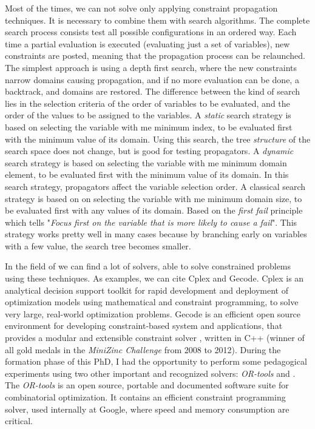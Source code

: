 Most of the times, we can not solve \csps{} only applying constraint propagation techniques. It is necessary to combine them with search algorithms. The complete search process consists test all possible configurations in an ordered way. Each time a partial evaluation is executed (evaluating just a set of variables), new constraints are posted, meaning that the propagation process can be relaunched. The simplest approach is using a depth first search, where the new constraints narrow domains causing propagation, and if no more evaluation can be done, a backtrack, and domains are restored. The difference between the kind of search lies in the selection criteria of the order of variables to be evaluated, and the order of the values to be assigned to the variables. A \textit{static} search strategy is based on selecting the variable with me minimum index, to be evaluated first with the minimum value of its domain. Using this search, the tree \textit{structure} of the search space does not change, but is good for testing propagators. A \textit{dynamic} search strategy is based on selecting the variable with me minimum domain element, to be evaluated first with the minimum value of its domain. In this search strategy, propagators affect the variable selection order. A classical search strategy is based on on selecting the variable with me minimum domain size, to be evaluated first with any values of its domain. Based on the \textit{first fail} principle which tells "\textit{Focus first on the variable that is more likely to cause a fail}". This strategy works pretty well in many cases because by branching early on variables with a few value, the search tree becomes smaller.

In the field of \cp{} we can find a lot of solvers, able to solve constrained problems using these techniques. As examples, we can cite {\sc Cplex} and {\sc Gecode}. {\sc Cplex} is an analytical decision support toolkit for rapid development and deployment of optimization models using mathematical and constraint programming, to solve very large, real-world optimization problems. {\sc Gecode} is an efficient open source environment for developing constraint-based system and applications, that provides a modular and extensible constraint solver \cite{Gecode}, written in C++ (winner of all gold medals in the \textit{MiniZinc Challenge} from 2008 to 2012). During the formation phase of this PhD, I had the opportunity to perform some pedagogical experiments using two other important and recognized solvers: \textit{OR-tools} and \choco. The \textit{OR-tools} is an open source, portable and documented software suite for combinatorial optimization. It contains an efficient  constraint programming solver, used internally at Google, where speed and memory consumption are critical.

